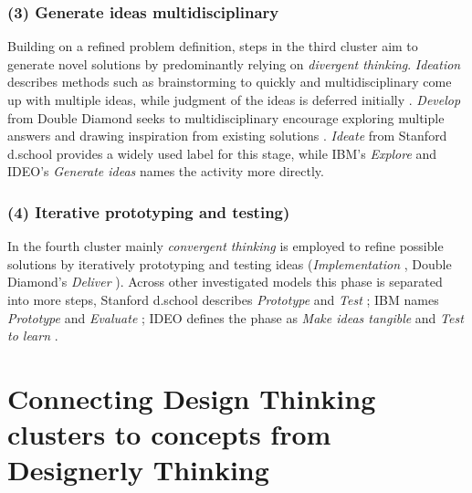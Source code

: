 \documentclass[draft,twoside]{vutinfth}
\begin{document}
            \subsubsection{(3) Generate ideas multidisciplinary}
                Building on a refined problem definition, steps in the third cluster aim to generate novel solutions by predominantly relying on \textit{divergent thinking}. 
                \textit{Ideation} describes methods such as brainstorming to quickly and multidisciplinary come up with multiple ideas, while judgment of the ideas 
                is deferred initially \cite{brownDesignThinkingSocial2010}. \textit{Develop} from Double Diamond seeks to multidisciplinary encourage 
                exploring multiple answers and drawing inspiration from existing solutions \cite{DoubleDiamondDesign}. \textit{Ideate} from 
                Stanford d.school provides a widely used label for this stage, while IBM's \textit{Explore} and IDEO's \textit{Generate ideas} 
                \cite{micheliDoingDesignThinking2019, DesignThinkingIDEO} names the activity more directly. 

            \subsubsection{(4) Iterative prototyping and testing)}
                In the fourth cluster mainly \textit{convergent thinking} is employed to refine possible solutions by iteratively prototyping 
                and testing ideas (\textit{Implementation} \cite{brownDesignThinkingSocial2010}, Double Diamond's \textit{Deliver} \cite{DoubleDiamondDesign}). Across 
                other investigated models this phase is separated into more steps, Stanford d.school describes \textit{Prototype} and \textit{Test} 
                \cite{micheliDoingDesignThinking2019}; IBM names \textit{Prototype} and \textit{Evaluate} \cite{micheliDoingDesignThinking2019}; 
                IDEO defines the phase as \textit{Make ideas tangible} and \textit{Test to learn} \cite{DesignThinkingIDEO}. 

        \section{Connecting Design Thinking clusters to concepts from Designerly Thinking}
            
\end{document}
